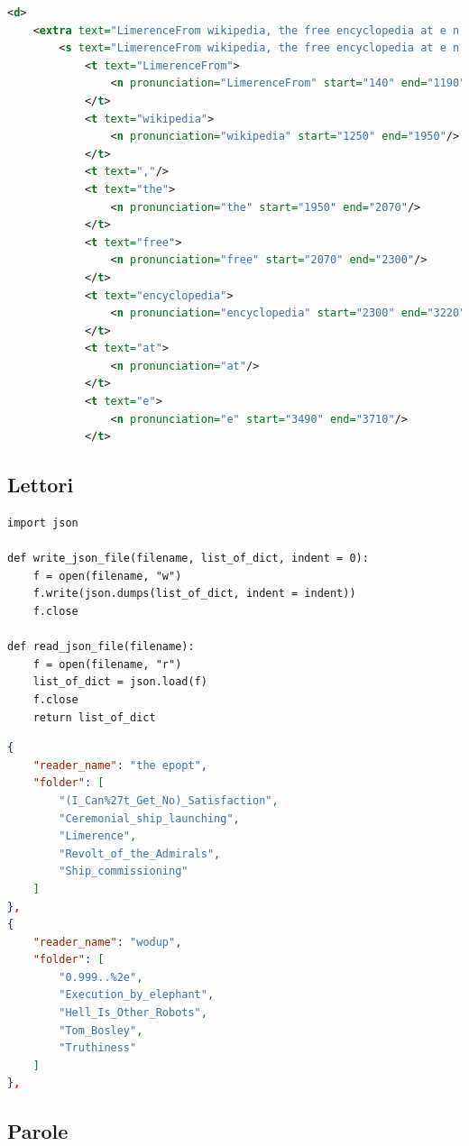 \documentclass[12pt,a4paper,titlepage]{article}
\begin{document}
\begin{lstlisting}[language=XML,firstnumber=1, caption=Annotazioni delle parole in un audio, label=annotazioni,captionpos=b]
<d>
	<extra text="LimerenceFrom wikipedia, the free encyclopedia at e n dot wikipedia dot org.">
		<s text="LimerenceFrom wikipedia, the free encyclopedia at e n dot wikipedia dot org.">
			<t text="LimerenceFrom">
				<n pronunciation="LimerenceFrom" start="140" end="1190"/>
			</t>
			<t text="wikipedia">
				<n pronunciation="wikipedia" start="1250" end="1950"/>
			</t>
			<t text=","/>
			<t text="the">
				<n pronunciation="the" start="1950" end="2070"/>
			</t>
			<t text="free">
				<n pronunciation="free" start="2070" end="2300"/>
			</t>
			<t text="encyclopedia">
				<n pronunciation="encyclopedia" start="2300" end="3220"/>
			</t>
			<t text="at">
				<n pronunciation="at"/>
			</t>
			<t text="e">
				<n pronunciation="e" start="3490" end="3710"/>
			</t>
\end{lstlisting}

\subsection{Lettori}
\label{subsec:lettori}

\begin{lstlisting}[language=iPython,firstnumber=1, caption=json\_manager.py, label=json_manager,captionpos=b]
import json
	
def write_json_file(filename, list_of_dict, indent = 0):
	f = open(filename, "w")
	f.write(json.dumps(list_of_dict, indent = indent))
	f.close
	
def read_json_file(filename):
	f = open(filename, "r")
	list_of_dict = json.load(f)
	f.close
	return list_of_dict
\end{lstlisting}

\begin{lstlisting}[language=json,firstnumber=1, caption=Formato JSON dei lettori, label=JSON_lettori,captionpos=b]
{
	"reader_name": "the epopt",
	"folder": [
		"(I_Can%27t_Get_No)_Satisfaction",
		"Ceremonial_ship_launching",
		"Limerence",
		"Revolt_of_the_Admirals",
		"Ship_commissioning"
	]
},
{
	"reader_name": "wodup",
	"folder": [
		"0.999..%2e",
		"Execution_by_elephant",
		"Hell_Is_Other_Robots",
		"Tom_Bosley",
		"Truthiness"
	]
},
\end{lstlisting}

\subsection{Parole}
\label{subsec:parole}
\end{document}
